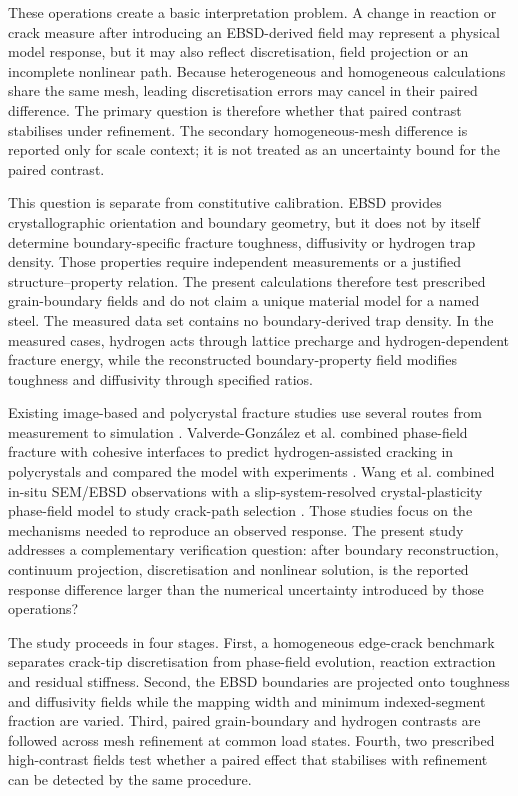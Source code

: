 \documentclass[preprint,12pt]{elsarticle}
\begin{document}
These operations create a basic interpretation problem. A change in reaction or
crack measure after introducing an EBSD-derived field may represent a physical
model response, but it may also reflect discretisation, field projection or an
incomplete nonlinear path. Because heterogeneous and homogeneous calculations
share the same mesh, leading discretisation errors may cancel in their paired
difference. The primary question is therefore whether that paired contrast
stabilises under refinement. The secondary homogeneous-mesh difference is reported only for scale context; it is not treated as an uncertainty bound for the paired contrast.

This question is separate from constitutive calibration. EBSD provides
crystallographic orientation and boundary geometry, but it does not by itself
determine boundary-specific fracture toughness, diffusivity or hydrogen trap
density. Those properties require independent measurements or a justified
structure--property relation. The present calculations therefore test prescribed
grain-boundary fields and do not claim a unique material model for a named steel.
The measured data set contains no boundary-derived trap density. In the measured
cases, hydrogen acts through lattice precharge and hydrogen-dependent fracture
energy, while the reconstructed boundary-property field modifies toughness and diffusivity through
specified ratios.

Existing image-based and polycrystal fracture studies use several routes from
measurement to simulation \cite{nguyen2015,emdadi2021,diehl2017}.
Valverde-Gonz\'alez et al. combined phase-field fracture with cohesive interfaces
to predict hydrogen-assisted cracking in polycrystals and compared the model with
experiments \cite{ValverdeGonzalez2022}. Wang et al. combined in-situ SEM/EBSD
observations with a slip-system-resolved crystal-plasticity phase-field model to
study crack-path selection \cite{Wang2026Plasticity}. Those studies focus on the
mechanisms needed to reproduce an observed response. The present study addresses
a complementary verification question: after boundary reconstruction, continuum
projection, discretisation and nonlinear solution, is the reported response
difference larger than the numerical uncertainty introduced by those operations?

The study proceeds in four stages. First, a homogeneous edge-crack benchmark
separates crack-tip discretisation from phase-field evolution, reaction extraction
and residual stiffness. Second, the EBSD boundaries are projected onto toughness
and diffusivity fields while the mapping width and minimum indexed-segment
fraction are varied. Third, paired grain-boundary and hydrogen contrasts are
followed across mesh refinement at common load states. Fourth, two prescribed
high-contrast fields test whether a paired effect that stabilises with refinement
can be detected by the same procedure.
\end{document}
